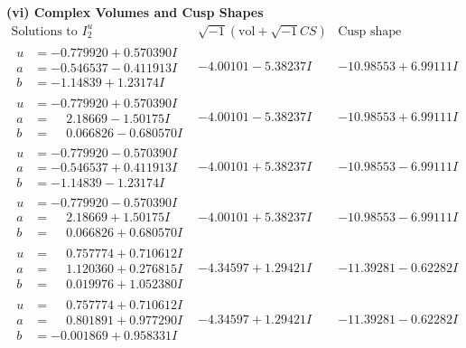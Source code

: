 \documentclass[1p]{elsarticle_modified}
\theoremstyle{definition}
\newcommand{\I}{\sqrt{-1}}
\begin{document}
\newpage\flushleft \textbf{(vi) Complex Volumes and Cusp Shapes}
$$\begin{array}{c|c|c}  
\text{Solutions to }I^u_{2}& \I (\text{vol} + \sqrt{-1}CS) & \text{Cusp shape}\\
 \hline 
\begin{aligned}
u &= -0.779920 + 0.570390 I \\
a &= -0.546537 - 0.411913 I \\
b &= -1.14839 + 1.23174 I\end{aligned}
 & -4.00101 - 5.38237 I & -10.98553 + 6.99111 I \\ \hline\begin{aligned}
u &= -0.779920 + 0.570390 I \\
a &= \phantom{-}2.18669 - 1.50175 I \\
b &= \phantom{-}0.066826 - 0.680570 I\end{aligned}
 & -4.00101 - 5.38237 I & -10.98553 + 6.99111 I \\ \hline\begin{aligned}
u &= -0.779920 - 0.570390 I \\
a &= -0.546537 + 0.411913 I \\
b &= -1.14839 - 1.23174 I\end{aligned}
 & -4.00101 + 5.38237 I & -10.98553 - 6.99111 I \\ \hline\begin{aligned}
u &= -0.779920 - 0.570390 I \\
a &= \phantom{-}2.18669 + 1.50175 I \\
b &= \phantom{-}0.066826 + 0.680570 I\end{aligned}
 & -4.00101 + 5.38237 I & -10.98553 - 6.99111 I \\ \hline\begin{aligned}
u &= \phantom{-}0.757774 + 0.710612 I \\
a &= \phantom{-}1.120360 + 0.276815 I \\
b &= \phantom{-}0.019976 + 1.052380 I\end{aligned}
 & -4.34597 + 1.29421 I & -11.39281 - 0.62282 I \\ \hline\begin{aligned}
u &= \phantom{-}0.757774 + 0.710612 I \\
a &= \phantom{-}0.801891 + 0.977290 I \\
b &= -0.001869 + 0.958331 I\end{aligned}
 & -4.34597 + 1.29421 I & -11.39281 - 0.62282 I \\ \hline\begin{aligned}

\end{aligned}
\end{array}$$
\end{document}
